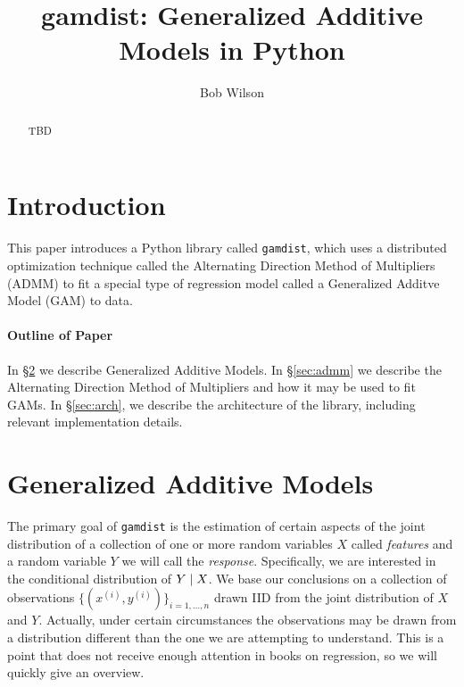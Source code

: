 \documentclass[12pt]{article}
\title{gamdist: Generalized Additive Models in Python}
\author{Bob Wilson}
\newcommand{\gamdist}{\texttt{gamdist}}
\begin{document}
\maketitle

\begin{abstract}
TBD
\end{abstract}

\newpage
\tableofcontents
\newpage

\section{Introduction}
This paper introduces a Python library called \gamdist{}, which uses a distributed optimization technique called the Alternating Direction Method of Multipliers (ADMM) to fit a special type of regression model called a Generalized Additve Model (GAM)  to data. 

\paragraph{Outline of Paper} In \S\ref{sec:gam} we describe Generalized Additive Models. In \S\ref{sec:admm} we describe the Alternating Direction Method of Multipliers and how it may be used to fit GAMs. In \S\ref{sec:arch}, we describe the architecture of the library, including relevant implementation details.

\section{Generalized Additive Models}
\label{sec:gam}

The primary goal of \gamdist{} is the estimation of certain aspects of the joint distribution of a collection of one or more random variables $X$ called \textit{features} and a random variable $Y$ we will call the \textit{response}. Specifically, we are interested in the conditional distribution of $Y \; | \; X$. We base our conclusions on a collection of observations $\{ (x^{(i)}, y^{(i)}) \}_{i=1, \dots, n}$ drawn IID from the joint distribution of $X$ and $Y$. Actually, under certain circumstances the observations may be drawn from a distribution different than the one we are attempting to understand. This is a point that does not receive enough attention in books on regression, so we will quickly give an overview.
\end{document}

